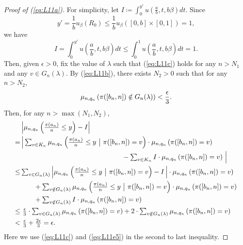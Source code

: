 \begin{proof}[Proof of (\ref{eq:L11a})]
For simplicity, let $I \coloneqq \int_{0}^{y'} u\left(\frac{a}{b}, t, b \beta\right)dt$. Since
\[
y' = \frac{1}{b} u_{\beta}(R_0) \le \frac{1}{b} u_{\beta}([0 , b]\times[0, 1]) = 1,
\]
we have
\[
I = \int_{0}^{y'} u\left(\frac{a}{b}, t, b \beta\right)dt \le \int_{0}^{1} u\left(\frac{a}{b}, t, b \beta\right)dt =1.
\]
Then, given $\epsilon >0$, fix the value of $\lambda$ such that (\ref{eq:L11c}) holds for any $n > N_1$ and any $v \in G_n(\lambda)$.
By (\ref{eq:L11b}), there exists $N_2>0$ such that for any $n > N_2$,
\begin{equation}
\mu_{n, q_n} \left( \pi([b_n, n]) \notin G_n(\lambda) \right) < \frac{\epsilon}{3}. \label{eq:L11e5}
\end{equation}
Then, for any $n > \max{(N_1, N_2)}$,
\begin{align*}
  &\textstyle \left| \mu_{n, q_n} \left( \frac{\pi(a_n)}{n} \le y \right) - I \right|\\
 =&\, \textstyle \Big|\sum_{v \in K_n} \mu_{n, q_n} \left( \frac{\pi(a_n)}{n} \le y \ \big|\  \pi([b_n, n]) = v \right)\cdot \mu_{n, q_n} \left( \pi([b_n, n]) = v \right)\\
  &\qquad\qquad\qquad\qquad\qquad\qquad\qquad\quad - \textstyle\sum_{v \in K_n} I \cdot \mu_{n, q_n} \left( \pi([b_n, n]) = v \right)  \, \Big|\\
 \le& \textstyle\sum_{v \in G_n(\lambda)}\Big|\mu_{n, q_n} \left( \frac{\pi(a_n)}{n} \le y \ \big|\  \pi([b_n, n]) = v \right) - I\, \Big| \cdot
   \mu_{n, q_n} \left( \pi([b_n, n]) = v \right) \\
  &\qquad\textstyle  + \sum_{v \notin G_n(\lambda)} \mu_{n, q_n} \left( \frac{\pi(a_n)}{n} \le y \ \big|\  \pi([b_n, n]) = v \right)\cdot
   \mu_{n, q_n} \left( \pi([b_n, n]) = v \right)\\
  &\qquad \textstyle + \sum_{v \notin G_n(\lambda)} I \cdot \mu_{n, q_n} \left( \pi([b_n, n]) = v \right)\\
 \le&\ \textstyle \frac{\epsilon}{3}\cdot \sum_{v \in G_n(\lambda)} \mu_{n, q_n} \left( \pi([b_n, n]) = v \right) +
   2 \cdot \sum_{v \notin G_n(\lambda)} \mu_{n, q_n} \left( \pi([b_n, n]) = v \right)\\
 <&\ \textstyle \frac{\epsilon}{3} + \frac{2\epsilon}{3} = \epsilon.
\end{align*}
Here we use (\ref{eq:L11c}) and (\ref{eq:L11e5}) in the second to last inequality.
\end{proof}






